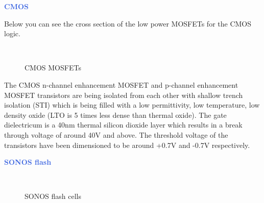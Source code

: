 \documentclass[10pt,a4paper]{article}
\renewcommand{\subsection}[1]{
	\vspace{20pt}
	\textcolor{RoyalBlue}{\textbf{\large{#1}}}
}
\begin{document}
\subsection{CMOS}

Below you can see the cross section of the low power MOSFETs for the CMOS logic.

\begin{figure}[H]
	\centering
	\begin{tikzpicture}[node distance = 3cm, auto, thick, scale=0.7, every node/.style={transform shape}]
		
	\end{tikzpicture}\\
	\caption{CMOS MOSFETs}
\end{figure}

The CMOS n-channel enhancement MOSFET and p-channel enhancement MOSFET transistors are being isolated from each
other with shallow trench isolation (STI) which is being filled with a low permittivity,
low temperature, low density oxide (LTO is 5 times less dense than thermal oxide).
The gate dielectricum is a 40nm thermal silicon dioxide layer which results in a break through voltage of around 40V and above.
The threshold voltage of the transistors have been dimensioned to be around +0.7V and -0.7V respectively.

\subsection{SONOS flash}

\begin{figure}[H]
	\centering
	\begin{tikzpicture}[node distance = 3cm, auto, thick, scale=0.7, every node/.style={transform shape}]
		
	\end{tikzpicture}\\
	\caption{SONOS flash cells}
\end{figure}
\end{document}
